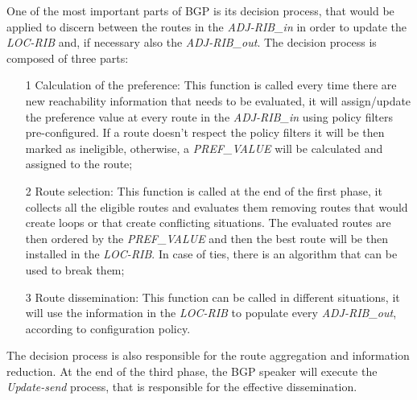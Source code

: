 One of the most important parts of \ac{BGP} is its decision process, that would
be applied to discern between the routes in the \textit{ADJ-RIB\_in} in order
to update the \textit{LOC-RIB} and, if necessary also the \textit{ADJ-RIB\_out}.
The decision process is composed of three parts:
\begin{itemize}
	\item[1] Calculation of the preference: This function is called every time
		there are new reachability information that needs to be evaluated, it
		will assign/update the preference value at every route in the
		\textit{ADJ-RIB\_in} using policy filters pre-configured. If a route
		doesn't respect the policy filters it will be then marked as ineligible,
		otherwise, a \textit{PREF\_VALUE} will be calculated and assigned to the
		route;
	\item[2] Route selection: This function is called at the end of the first
		phase, it collects all the eligible routes and evaluates them removing
		routes that would create loops or that create conflicting situations.
		The evaluated routes are then ordered by the \textit{PREF\_VALUE} and
		then the best route will be then installed in the \textit{LOC-RIB}.
		In case of ties, there is an algorithm that can be used to break them;
	\item[3] Route dissemination: This function can be called in different
		situations, it will use the information in the \textit{LOC-RIB} to
		populate every \textit{ADJ-RIB\_out}, according to configuration
		policy.
\end{itemize}
The decision process is also responsible for the route aggregation and information
reduction.
At the end of the third phase, the \ac{BGP} speaker will execute the
\textit{Update-send} process, that is responsible for the effective dissemination.

